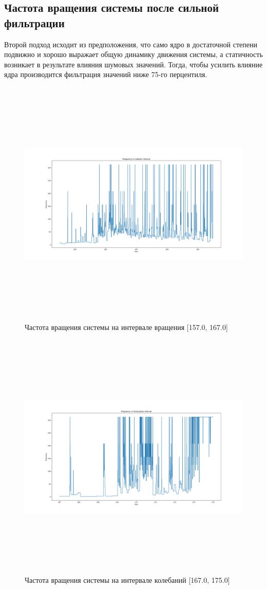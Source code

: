 \documentclass[a4paper,12pt]{article} %
\begin{document}
	\subsection{Частота вращения системы после сильной фильтрации}
	Второй подход исходит из предположения, что само ядро в достаточной степени подвижно и хорошо выражает общую динамику движения системы, а статичность возникает в результате влияния шумовых значений. Тогда, чтобы усилить влияние ядра производится  фильтрация значений ниже 75-го перцентиля.
	\begin{figure}[H]
		\includegraphics[width = 18cm, height = 12cm]{Rot_filtered.png}
		\caption{Частота вращения системы на интервале вращения [157.0, 167.0]}
		\label{fig:rot_filtered}
	\end{figure}
	\begin{figure}[H]
		
		\includegraphics[width = 18cm, height = 12cm]{Fluct_filtered.png}
		\caption{Частота вращения системы на интервале колебаний [167.0, 175.0]}
		\label{fig:fluct_filtered}
	\end{figure}
	
\end{document}
